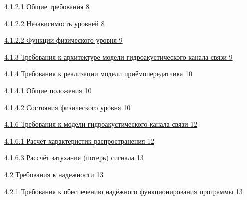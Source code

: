 \hyperref[ux43eux431ux449ux438ux435-ux442ux440ux435ux431ux43eux432ux430ux43dux438ux44f]{4.1.2.1
Общие требования 8}

\hyperref[ux43dux435ux437ux430ux432ux438ux441ux438ux43cux43eux441ux442ux44c-ux443ux440ux43eux432ux43dux435ux439]{4.1.2.2
Независимость уровней 8}

\hyperref[ux444ux443ux43dux43aux446ux438ux438-ux444ux438ux437ux438ux447ux435ux441ux43aux43eux433ux43e-ux443ux440ux43eux432ux43dux44f]{4.1.2.2
Функции физического уровня 9}

\hyperref[ux442ux440ux435ux431ux43eux432ux430ux43dux438ux44f-ux43a-ux430ux440ux445ux438ux442ux435ux43aux442ux443ux440ux435-ux43cux43eux434ux435ux43bux438-ux433ux438ux434ux440ux43eux430ux43aux443ux441ux442ux438ux447ux435ux441ux43aux43eux433ux43e-ux43aux430ux43dux430ux43bux430-ux441ux432ux44fux437ux438]{4.1.3
Требования к архитектуре модели гидроакустического канала связи 9}

\hyperref[ux442ux440ux435ux431ux43eux432ux430ux43dux438ux44f-ux43a-ux440ux435ux430ux43bux438ux437ux430ux446ux438ux438-ux43cux43eux434ux435ux43bux438-ux43fux440ux438ux451ux43cux43eux43fux435ux440ux435ux434ux430ux442ux447ux438ux43aux430]{4.1.4
Требования к реализации модели приёмопередатчика 10}

\hyperref[ux43eux431ux449ux438ux435-ux43fux43eux43bux43eux436ux435ux43dux438ux44f]{4.1.4.1
Общие положения 10}

\hyperref[ux441ux43eux441ux442ux43eux44fux43dux438ux44f-ux444ux438ux437ux438ux447ux435ux441ux43aux43eux433ux43e-ux443ux440ux43eux432ux43dux44f]{4.1.4.2
Состояния физического уровня 10}

\hyperref[_rgwhsh7we1q0]{4.1.6 Требования к модели гидроакустического
канала связи 12}

\hyperref[_ytskkr1fx40n]{4.1.6.1 Расчёт характеристик распространения
12}

\hyperref[_lhvuj3g4c8ca]{4.1.6.3 Рассчёт затухания (потерь) сигнала 13}

\hyperref[_uhesppck4kdg]{4.2 Требования к надежности 13}

\hyperref[ux442ux440ux435ux431ux43eux432ux430ux43dux438ux44f-ux43a-ux43eux431ux435ux441ux43fux435ux447ux435ux43dux438ux44e-ux43dux430ux434ux451ux436ux43dux43eux433ux43e-ux444ux443ux43dux43aux446ux438ux43eux43dux438ux440ux43eux432ux430ux43dux438ux44f-ux43fux440ux43eux433ux440ux430ux43cux43cux44b]{4.2.1
Требования к обеспечению}
\hyperref[ux442ux440ux435ux431ux43eux432ux430ux43dux438ux44f-ux43a-ux43eux431ux435ux441ux43fux435ux447ux435ux43dux438ux44e-ux43dux430ux434ux451ux436ux43dux43eux433ux43e-ux444ux443ux43dux43aux446ux438ux43eux43dux438ux440ux43eux432ux430ux43dux438ux44f-ux43fux440ux43eux433ux440ux430ux43cux43cux44b]{надёжного
функционирования программы 13}

